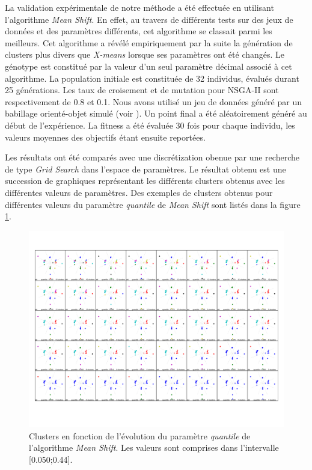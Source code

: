 \documentclass[draft]{llncs}
\begin{document}
La validation expérimentale de notre méthode a été effectuée en utilisant l'algorithme \textit{Mean Shift}.
En effet, au travers de différents tests sur des jeux de données et des paramètres différents, cet algorithme se classait parmi les meilleurs.
Cet algorithme a révélé empiriquement par la suite la génération de clusters plus divers que \mbox{\textit{X-means}} lorsque ses paramètres ont été changés.
Le génotype est constitué par la valeur d'un seul paramètre décimal associé à cet algorithme.
La population initiale est constituée de 32 individus, évalués durant 25 générations. Les taux de croisement et de mutation pour NSGA-II sont respectivement de 0.8 et 0.1. Nous avons utilisé un jeu de données généré par un babillage orienté-objet simulé (voir ).
Un point final a été aléatoirement généré au début de l'expérience. La fitness a été évaluée 30 fois pour chaque individu, les valeurs moyennes des objectifs étant ensuite reportées.

Les résultats ont été comparés avec une discrétization obenue par une recherche de type \textit{Grid Search} dans l'espace de paramètres.
Le résultat obtenu est une succession de graphiques représentant les différents clusters obtenus avec les différentes valeurs de paramètres.
Des exemples de clusters obtenus pour différentes valeurs du paramètre \textit{quantile} de \textit{Mean Shift} sont listés dans la figure \ref{fig:validation}.

\begin{figure}[ht]
  \begin{center}
  \includegraphics[width=\textwidth]{figures/DS2_MS.pdf}
    \caption{Clusters en fonction de l'évolution du paramètre \textit{quantile} de l'algorithme \textit{Mean Shift}. Les valeurs sont comprises dans l'intervalle [0.050;0.44].}
  \label{fig:validation}
  \end{center}
\end{figure}
\end{document}
